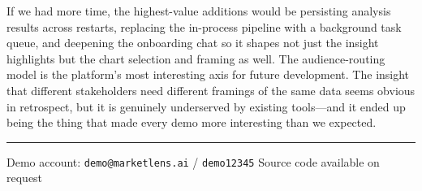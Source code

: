 \documentclass[9pt, a4paper, twocolumn]{article}
\begin{document}
If we had more time, the highest-value additions would be persisting analysis results across restarts, replacing the in-process pipeline with a background task queue, and deepening the onboarding chat so it shapes not just the insight highlights but the chart selection and framing as well. The audience-routing model is the platform's most interesting axis for future development. The insight that different stakeholders need different framings of the same data seems obvious in retrospect, but it is genuinely underserved by existing tools---and it ended up being the thing that made every demo more interesting than we expected.

\vspace{5pt}
\noindent\rule{\linewidth}{0.4pt}
{\fontsize{6.5pt}{8pt}\selectfont\color{slate}
Demo account: \texttt{demo@marketlens.ai} / \texttt{demo12345}
\hfill
Source code available on request}
\end{document}
